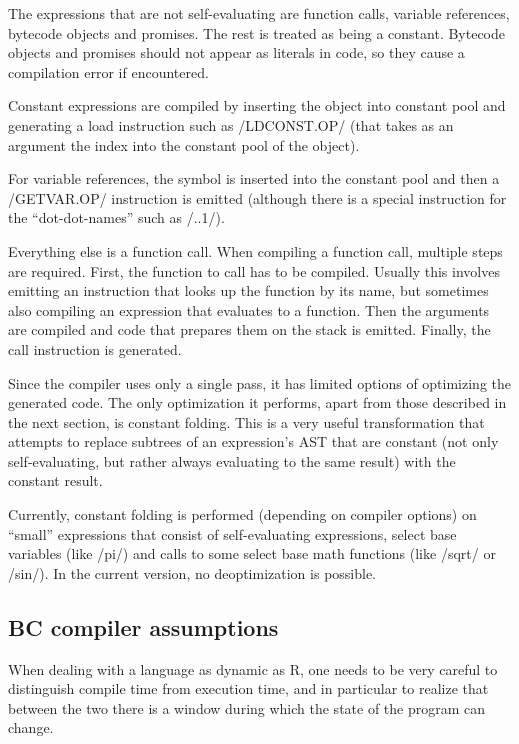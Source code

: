 {The expressions that are not self-evaluating are function calls, variable references, bytecode objects and promises. The rest is treated as being a constant. Bytecode objects and promises should not appear as literals in code, so they cause a compilation error if encountered.

Constant expressions are compiled by inserting the object into constant pool and generating a load instruction such as \rinline/LDCONST.OP/ (that takes as an argument the index into the constant pool of the object).

For variable references, the symbol is inserted into the constant pool and then a \rinline/GETVAR.OP/ instruction is emitted (although there is a special instruction for the ``dot-dot-names'' such as \rinline/..1/).

Everything else is a function call. When compiling a function call, multiple steps are required. First, the function to call has to be compiled. Usually this involves emitting an instruction that looks up the function by its name, but sometimes also compiling an expression that evaluates to a function. Then the arguments are compiled and code that prepares them on the stack is emitted. Finally, the call instruction is generated.

Since the compiler uses only a single pass, it has limited options of optimizing the generated code. The only optimization it performs, apart from those described in the next section, is constant folding. This is a very useful transformation that attempts to replace subtrees of an expression's AST that are constant (not only self-evaluating, but rather always evaluating to the same result) with the constant result.

Currently, constant folding is performed (depending on compiler options) on ``small'' expressions that consist of self-evaluating expressions, select base variables (like \rinline/pi/) and calls to some select base math functions (like \rinline/sqrt/ or \rinline/sin/). In the current version, no deoptimization is possible.

\subsection{BC compiler assumptions\label{assumptions}}

When dealing with a language as dynamic as R, one needs to be very careful to distinguish compile time from execution time, and in particular to realize that between the two there is a window during which the state of the program can change.

}
